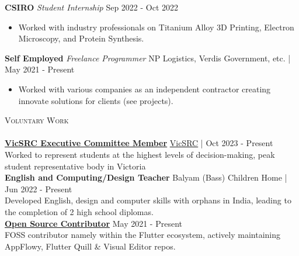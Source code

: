 \documentclass[a4paper]{article}
\newcommand{\lineunder} {
    \vspace*{-8pt} \\
    \hspace*{-10pt} \hrulefill \\
}
\newcommand{\header} [1] {
    {\hspace*{-10pt}\vspace*{6pt} \textsc{#1}}
    \vspace*{-6pt} \lineunder
}
\begin{document}
\textbf{CSIRO} \textit{Student Internship} \hfill Sep 2022 - Oct 2022\\
\vspace{-3mm}
\begin{itemize} \itemsep 0.5pt
\item Worked with industry professionals on Titanium Alloy 3D Printing, Electron Microscopy, and Protein Synthesis.
\end{itemize}
\vspace{-2mm}

\textbf{Self Employed} \textit{Freelance Programmer} \hfill NP Logistics, Verdis Government, etc. | May 2021 - Present\\
\vspace{-3mm}
\begin{itemize} \itemsep 0.5pt
	\item Worked with various companies as an independent contractor creating innovate solutions for clients (see projects).
\end{itemize}
\vspace{-2mm}

\header{Voluntary Work}
\href{https://vicsrc.org.au/about/executive-committee}{\ul{\textbf{VicSRC Executive Committee Member}}} \hfill \href{https://vicsrc.org.au/}{VicSRC} | Oct 2023 - Present\\
Worked to represent students at the highest levels of decision-making, peak student representative body in Victoria\\
\vspace*{1.5mm}
{\textbf{English and Computing/Design Teacher}} \hfill Balyam (Bass) Children Home | Jun 2022 - Present\\
Developed English, design and computer skills with orphans in India, leading to the completion of 2 high school diplomas. \\
\vspace*{1.5mm}
\href{https://github.com/garv-shah}{\textbf{\ul{Open Source Contributor}}} \hfill May 2021 - Present\\
FOSS contributor namely within the Flutter ecosystem, actively maintaining AppFlowy, Flutter Quill \& Visual Editor repos.\\
\vspace*{1.5mm}
\end{document}
